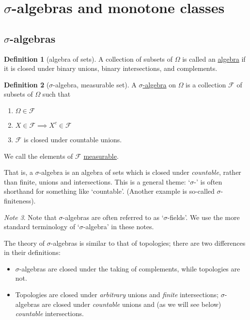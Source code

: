 \documentclass[a4paper,12pt]{scrreprt}
\newcommand{\defn}[1]{\ul{#1}}
\theoremstyle{definition}
\newtheorem{definition}{Definition}
\theoremstyle{plain}
\theoremstyle{remark}
\newtheorem{note}[definition]{Note}
\begin{document}
\section{\texorpdfstring{$\sigma$}{s}-algebras and monotone classes}
\subsection{\texorpdfstring{$\sigma$}{Lg}-algebras}
\begin{definition}[algebra of sets]
  \label{def:algebraofsets}
  A collection of subsets of $\Omega$ is called an \defn{algebra} if it is closed under binary unions, binary intersections, and complements.
\end{definition}

\begin{definition}[$\sigma$-algebra, measurable set]
  \label{def:sigmaalgebra}
  A \defn{$\sigma$-algebra} on $\Omega$ is a collection $\mathcal{F}$ of subsets of $\Omega$ such that
  \begin{enumerate}
    \item $\Omega \in \mathcal{F}$
    \item $X \in \mathcal{F} \implies X^{c} \in \mathcal{F}$
    \item $\mathcal{F}$ is closed under countable unions.
  \end{enumerate}

  We call the elements of $\mathcal{F}$ \defn{measurable}.
\end{definition}

That is, a $\sigma$-algebra is an algebra of sets which is closed under \emph{countable}, rather than finite, unions and intersections. This is a general theme: `$\sigma$-' is often shorthand for something like `countable'. (Another example is so-called $\sigma$-finiteness).

\begin{note}
  Note that $\sigma$-algebras are often referred to as `$\sigma$-fields'. We use the more standard terminology of `$\sigma$-algebra' in these notes.
\end{note}

The theory of $\sigma$-algebras is similar to that of topologies; there are two differences in their definitions:
\begin{itemize}
  \item $\sigma$-algebras are closed under the taking of complements, while topologies are not.

  \item Topologies are closed under \emph{arbitrary} unions and \emph{finite} intersections; $\sigma$-algebras are closed under \emph{countable} unions and (as we will see below) \emph{countable} intersections.
\end{itemize}
\end{document}
